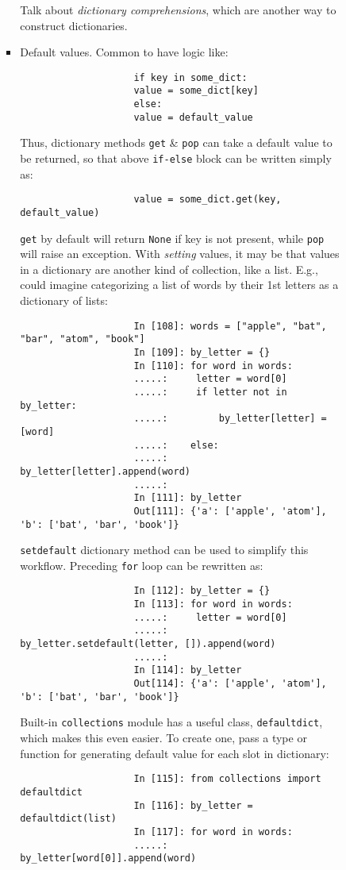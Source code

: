 \documentclass{article}
\begin{document}
\begin{itemize}
\begin{itemize}
\begin{itemize}
\begin{itemize}
\begin{verbatim}
				\end{verbatim}
				Talk about {\it dictionary comprehensions}, which are another way to construct dictionaries.
				\item {\sf Default values.} Common to have logic like:
				\begin{verbatim}
					if key in some_dict:
					value = some_dict[key]
					else:
					value = default_value
				\end{verbatim}
				Thus, dictionary methods {\tt get} \& {\tt pop} can take a default value to be returned, so that above {\tt if-else} block can be written simply as:
				\begin{verbatim}
					value = some_dict.get(key, default_value)
				\end{verbatim}
				{\tt get} by default will return {\tt None} if key is not present, while {\tt pop} will raise an exception. With {\it setting} values, it may be that values in a dictionary are another kind of collection, like a list. E.g., could imagine categorizing a list of words by their 1st letters as a dictionary of lists:
				\begin{verbatim}
					In [108]: words = ["apple", "bat", "bar", "atom", "book"]
					In [109]: by_letter = {}
					In [110]: for word in words:
					.....:     letter = word[0]
					.....:     if letter not in by_letter:
					.....:         by_letter[letter] = [word]
					.....:    else:
					.....:        by_letter[letter].append(word)
					.....:
					In [111]: by_letter
					Out[111]: {'a': ['apple', 'atom'], 'b': ['bat', 'bar', 'book']}
				\end{verbatim}
				{\tt setdefault} dictionary method can be used to simplify this workflow. Preceding {\tt for} loop can be rewritten as:
				\begin{verbatim}
					In [112]: by_letter = {}
					In [113]: for word in words:
					.....:     letter = word[0]
					.....:     by_letter.setdefault(letter, []).append(word)
					.....:
					In [114]: by_letter
					Out[114]: {'a': ['apple', 'atom'], 'b': ['bat', 'bar', 'book']}
				\end{verbatim}
				Built-in {\tt collections} module has a useful class, {\tt defaultdict}, which makes this even easier. To create one, pass a type or function for generating default value for each slot in dictionary:
				\begin{verbatim}
					In [115]: from collections import defaultdict
					In [116]: by_letter = defaultdict(list)
					In [117]: for word in words:
					.....:     by_letter[word[0]].append(word)

\end{verbatim}
\end{itemize}
\end{itemize}
\end{itemize}
\end{itemize}
\end{document}
